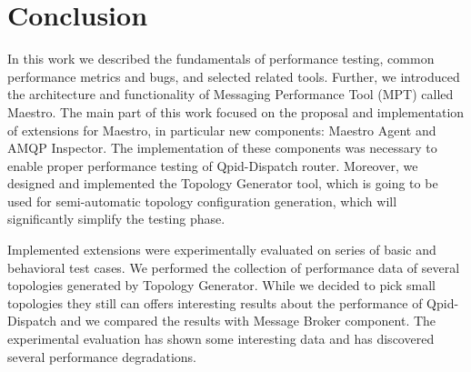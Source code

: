 
\chapter{Conclusion}
\label{Conclusion}
In this work we described the fundamentals of performance testing, common performance metrics and bugs, and selected related tools. Further, we introduced the architecture and functionality of Messaging Performance Tool (MPT) called Maestro. The main part of this work focused on the proposal and implementation of extensions for Maestro, in particular new components: Maestro Agent and AMQP Inspector. The implementation of these components was necessary to enable proper performance testing of Qpid-Dispatch router. Moreover, we designed and implemented the Topology Generator tool, which is going to be used for semi-automatic topology configuration generation, which will significantly simplify the testing phase.

%

Implemented extensions were experimentally evaluated on series of basic and behavioral test cases. We performed the collection of performance data of several topologies generated by Topology Generator. While we decided to pick small topologies they still can offers interesting results about the performance of Qpid-Dispatch and we compared the results with Message Broker component. The experimental evaluation has shown some interesting data and has discovered several performance degradations.

